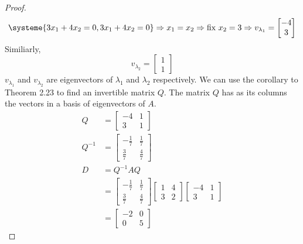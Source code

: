 \documentclass[11pt]{scrartcl}
\begin{document}
\begin{enumerate}[label=\alph*.]
{\begin{proof}
\[		      \]
		      \[
			      \systeme{
				      3x_1 + 4x_2 = 0,
				      3x_1 + 4x_2 = 0
			      }
			      \Rightarrow x_1 = x_2
			      \Rightarrow \text{fix } x_2 = 3
			      \Rightarrow v_{\lambda_1} =  \begin{bmatrix}-4 \\3 \end{bmatrix}
		      \]
		      Similiarly, $$v_{\lambda_2} =  \begin{bmatrix} 1 \\1 \end{bmatrix}$$
		      $v_{\lambda_1}$ and $v_{\lambda_2}$ are eigenvectors of $\lambda_1$ and $\lambda_2$ respectively.
		      We can use the corollary to Theorem 2.23 to find an invertible matrix $Q$.
		      The matrix $Q$ has as its  columns the vectors in a basis of eigenvectors of $A$.
		      \begin{align*}
			      Q      & =
			      \begin{bmatrix}
				      -4 & 1 \\
				      3  & 1
			      \end{bmatrix}           \\
			      Q^{-1} & =
			      \begin{bmatrix}
				      -\frac{1}{7} & \frac{1}{7} \\
				      \frac{3}{7}  & \frac{4}{7}
			      \end{bmatrix}           \\
			      D      & = Q^{-1} A Q                \\
			             & =
			      \begin{bmatrix}
				      -\frac{1}{7} & \frac{1}{7} \\
				      \frac{3}{7}  & \frac{4}{7}
			      \end{bmatrix}
			      \begin{bmatrix}
				      1 & 4 \\
				      3 & 2
			      \end{bmatrix}
			      \begin{bmatrix}
				      -4 & 1 \\
				      3  & 1
			      \end{bmatrix}           \\
			             & =\begin{bmatrix}
				      -2 & 0 \\
				      0  & 5
			      \end{bmatrix}
		      \end{align*}

\end{proof}}
\end{enumerate}
\end{document}
